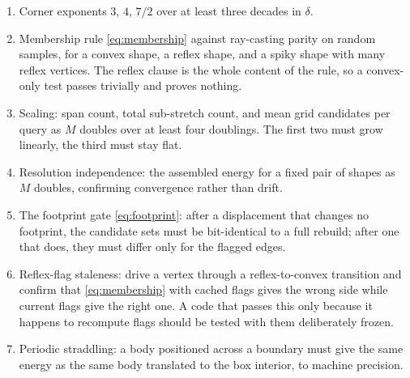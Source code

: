 \documentclass[11pt]{article}
\begin{document}
\begin{enumerate}
\item Corner exponents $3$, $4$, $7/2$ over at least three decades in $\delta$.
\item Membership rule \eqref{eq:membership} against ray-casting parity on random samples, for a convex shape, a reflex shape, and a spiky shape with many reflex vertices. The reflex clause is the whole content of the rule, so a convex-only test passes trivially and proves nothing.
\item Scaling: span count, total sub-stretch count, and mean grid candidates per query as $M$ doubles over at least four doublings. The first two must grow linearly, the third must stay flat.
\item Resolution independence: the assembled energy for a fixed pair of shapes as $M$ doubles, confirming convergence rather than drift.
\item The footprint gate \eqref{eq:footprint}: after a displacement that changes no footprint, the candidate sets must be bit-identical to a full rebuild; after one that does, they must differ only for the flagged edges.
\item Reflex-flag staleness: drive a vertex through a reflex-to-convex transition and confirm that \eqref{eq:membership} with cached flags gives the wrong side while current flags give the right one. A code that passes this only because it happens to recompute flags should be tested with them deliberately frozen.
\item Periodic straddling: a body positioned across a boundary must give the same energy as the same body translated to the box interior, to machine precision.
\end{enumerate}
\end{document}
